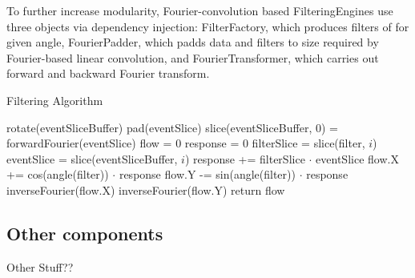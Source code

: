 To further increase modularity, Fourier-convolution based FilteringEngines use three objects via dependency injection: FilterFactory, which produces filters of for given angle, FourierPadder, which padds data and filters to size required by Fourier-based linear convolution, and FourierTransformer, which carries out forward and backward Fourier transform.

\begin{algorithm}
 \caption{Filtering Algorithm}
 \label{algo:optic}
 \begin{algorithmic}[1]
  \State rotate(eventSliceBuffer)
  \State pad(eventSlice)  
  \State slice(eventSliceBuffer, 0) = forwardFourier(eventSlice)
  \State flow = 0
  \State response = 0
  \State filterSlice = slice(filter, $i$)
  \State eventSlice = slice(eventSliceBuffer, $i$)
  \State response += filterSlice $\cdot$ eventSlice
  \EndFor
  \State flow.X += cos(angle(filter)) $\cdot$ response
  \State flow.Y -= sin(angle(filter)) $\cdot$ response
  \EndFor
  \State inverseFourier(flow.X)
  \State inverseFourier(flow.Y)
  \State return flow
  \EndProcedure
\end{algorithmic}

\end{algorithm}


\subsection{Other components}
Other Stuff??